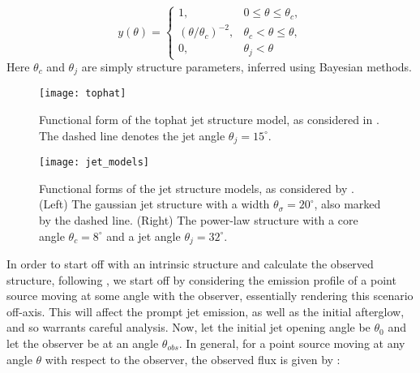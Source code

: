 \begin{itemize}
                \begin{equation}
                    \label{eq:5}
                    y(\theta) = \begin{cases}
                                    1,
                                        & 0 \leq \theta \leq \theta_c, \\
                                    (\theta/\theta_c)^{-2},
                                        & \theta_c < \theta \leq \theta, \\
                                    0,
                                        & \theta_j < \theta
                                \end{cases}
                \end{equation}
                Here $\theta_c$ and $\theta_j$ are simply structure parameters,
                inferred using Bayesian methods.

    \end{itemize}

    \begin{figure}[H]
        \centering
        \texttt{[image: tophat]}
        \caption[Tophat jet structure model]{
                    Functional form of the tophat jet structure model, as considered in
                    \cite{saleem_energetics_2020}. The dashed line denotes the jet angle
                    $\theta_j = 15^{\circ}$.
             }
        \label{fig:tophat}
    \end{figure}

    \begin{figure}[H]
        \centering
        \texttt{[image: jet\_models]}
        \caption[Jet structures as in \cite{hayes_comparing_2020}]{
                    Functional forms of the jet structure models, as considered by
                    \cite{hayes_comparing_2020}. (Left) The gaussian jet structure with
                    a width $\theta_{\sigma} = 20^{\circ}$, also marked by the dashed
                    line. (Right) The power-law structure with a core angle $\theta_c =
                    8^\circ$ and a jet angle $\theta_j = 32^\circ$.
             }
        \label{fig:jet_models}
    \end{figure}

    In order to start off with an intrinsic structure and calculate the observed
    structure, following \cite{granot_off-axis_2002}, we start off by
    considering the emission profile of a point source moving at some angle with
    the observer, essentially rendering this scenario off-axis. This will affect
    the prompt jet emission, as well as the initial afterglow, and so warrants
    careful analysis.  Now, let the initial jet opening angle be $\theta_0$ and
    let the observer be at an angle $\theta_{obs}$. In general, for a point
    source moving at any angle $\theta$ with respect to the observer, the
    observed flux is given by :

